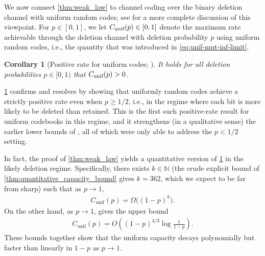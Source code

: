 \documentclass[11pt]{amsart}
\numberwithin{equation}{section}
\numberwithin{equation}{section}
\newcommand{\1}{\mathbbm{1}}
\newcommand{\unif}{\textup{unif}}
\newtheorem{corollary}[theorem]{Corollary}
\theoremstyle{definition}
\begin{document}
\smallskip


We now connect \cref{thm:weak_law} to channel coding over the binary deletion channel with uniform random codes; see \cite{pernice2024mutual} for a more complete discussion of this viewpoint. For $p \in [0,1]$, we let $C_{\unif}(p) \in [0,1]$ denote the maximum rate achievable through the deletion channel with deletion probability $p$ using uniform random codes, i.e., the quantity that was introduced in \eqref{eq:unif-mut-inf-limit}.

\begin{corollary}[Positive rate for uniform codes; {\cite[Conjecture 3]{pernice2024mutual}}]\label{cor:pos_mutual_info}
    It holds for all deletion probabilities $p \in [0, 1)$ that $C_{\unif}(p) > 0$.
\end{corollary}

\cref{cor:pos_mutual_info} confirms \cite[Conjecture 3]{pernice2024mutual} and resolves \cite[Question 1]{pernice2024mutual} by showing that uniformly random codes achieve a strictly positive rate even when $p \geq 1/2$, i.e., in the regime where each bit is more likely to be deleted than retained. This is the first such positive-rate result for uniform codebooks in this regime, and it strengthens (in a qualitative sense) the earlier lower bounds of \cite{gallager1961sequential, zigangirov1969sequential, diggavi2001transmission, drinea2006simple, rahmati2013bounds, han2016mutual}, all of which were only able to address the $p < 1/2$ setting.

In fact, the proof of \cref{thm:weak_law} yields a quantitative version of \cref{cor:pos_mutual_info} in the likely deletion regime. Specifically, there exists $k \in \mathbb{N}$ (the crude explicit bound of \cref{thm:quantitative_capacity_bound} gives $k=362$, which we expect to be far from sharp) such that as $p \to 1$,
\begin{align*}
    C_{\mathrm{unif}}(p) = \Omega\bigl((1-p)^k\bigr).
\end{align*}
On the other hand, as $p \to 1$, \cite{drmota2012mutual} gives the upper bound
\begin{align*}
    C_{\mathrm{unif}}(p) = O\left((1-p)^{4/3}\log \frac{1}{1-p}\right).
\end{align*}
These bounds together show that the uniform capacity decays polynomially but faster than linearly in $1-p$ as $p \to 1$.
\end{document}
